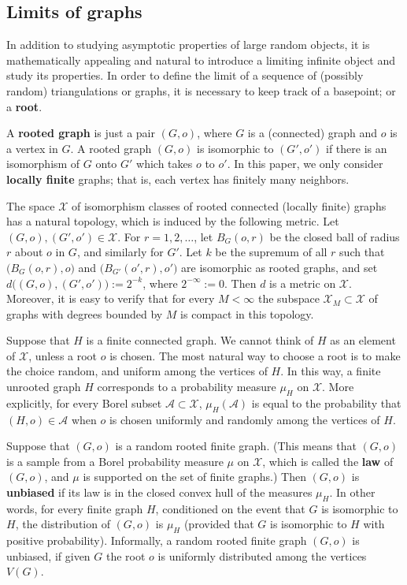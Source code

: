 \documentclass[12pt,naturalnames]{article}
\numberwithin{equation}{section}
\numberwithin{figure}{section}
\numberwithin{theorem}{section}
\def\ev#1{\mathcal{#1}}
\begin{document}
\subsection{Limits of graphs}

In addition to studying asymptotic properties of large random objects,
it is mathematically appealing and natural to introduce a limiting infinite
object and study its properties.
In order to define the limit of a sequence of (possibly random) triangulations
or graphs, it is necessary to keep track of a basepoint; or a {\bf root}.

A {\bf rooted graph} is just a pair $(G,o)$, where
$G$ is a (connected) graph and $o$ is a vertex in $G$.
A rooted graph $(G,o)$ is isomorphic to $(G',o')$
if there is an isomorphism of $G$ onto $G'$ which
takes $o$ to $o'$.
In this paper, we only consider {\bf locally finite} graphs;
that is, each vertex has finitely many neighbors.

The space $\mathcal X$ of isomorphism classes of rooted connected
(locally finite) graphs has a natural topology,
which is induced by the following metric.
Let $(G,o),(G',o')\in\mathcal X$. 
For $r=1,2,\dots$, let $B_G(o,r)$ be the closed ball of radius $r$ about $o$
in $G$, and similarly for $G'$.
Let $k$ be the supremum of all $r$ such that $\bigl(B_G(o,r),o\bigr)$ and
$\bigl(B_{G'}(o',r),o'\bigr)$ are
isomorphic as rooted graphs, and set
$d\bigl((G,o),(G',o')\bigr):=2^{-k}$, where $2^{-\infty}:=0$.
Then $d$ is a metric on $\mathcal X$.
Moreover, it is easy to verify that for every
$M<\infty$ the subspace $\mathcal X_M\subset\mathcal X$ of graphs 
with degrees bounded by $M$ is compact in this topology.

Suppose that $H$ is a finite connected graph.  We cannot
think of $H$ as an element of $\mathcal X$, unless a root $o$
is chosen.  The most natural way to choose a root
is to make the choice random, and uniform among the
vertices of $H$.  In this way, a finite unrooted graph
$H$ corresponds to a probability measure $\mu_H$ on
$\mathcal X$.  More explicitly, for every Borel subset
$\ev A\subset\mathcal X$, $\mu_H(\ev A)$ is
equal to the probability that $(H,o)\in\ev A$ when $o$
is chosen uniformly and randomly among the vertices of $H$.

Suppose that $(G,o)$ is a random rooted finite graph.
(This means that $(G,o)$ is a sample from a
Borel probability measure $\mu$ on $\mathcal X$,
which is called the {\bf law} of $(G,o)$,
and $\mu$ is supported on the set of finite graphs.)
Then $(G,o)$ is {\bf unbiased} if its law is in the
closed convex hull of the measures $\mu_H$.
In other words, for every finite graph $H$,
conditioned on the event that $G$ is isomorphic to
$H$, the distribution of $(G,o)$ is $\mu_H$
(provided that $G$ is isomorphic to $H$ with positive
probability).
Informally, a random rooted finite graph $(G,o)$ is unbiased,
if given $G$ the root $o$ is uniformly distributed among
the vertices $V(G)$.
\end{document}
